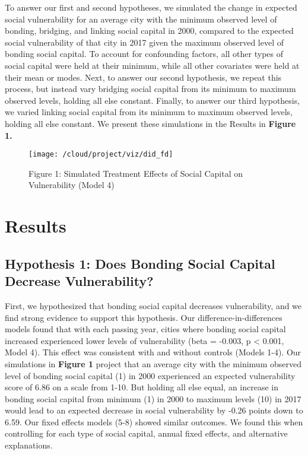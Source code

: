 \documentclass[]{elsarticle} %
\newcommand{\blandscape}{\begin{landscape}}
\newcommand{\elandscape}{\end{landscape}}
\begin{document}
To answer our first and second hypotheses, we simulated the change in
expected social vulnerability for an average city with the minimum
observed level of bonding, bridging, and linking social capital in 2000,
compared to the expected social vulnerability of that city in 2017 given
the maximum observed level of bonding social capital. To account for
confounding factors, all other types of social capital were held at
their minimum, while all other covariates were held at their mean or
modes. Next, to answer our second hypothesis, we repeat this process,
but instead vary bridging social capital from its minimum to maximum
observed levels, holding all else constant. Finally, to answer our third
hypothesis, we varied linking social capital from its minimum to maximum
observed levels, holding all else constant. We present these simulations
in the Results in \textbf{Figure 1.}

\newpage
\blandscape
\begin{figure}
\texttt{[image: /cloud/project/viz/did\_fd]} \caption{Figure 1: Simulated Treatment Effects of Social Capital on Vulnerability (Model 4)}\label{fig:fig1}
\end{figure}
\elandscape
\newpage

\hypertarget{results}{%
\section{Results}\label{results}}

\hypertarget{hypothesis-1-does-bonding-social-capital-decrease-vulnerability}{%
\subsection{Hypothesis 1: Does Bonding Social Capital Decrease
Vulnerability?}\label{hypothesis-1-does-bonding-social-capital-decrease-vulnerability}}

First, we hypothesized that bonding social capital decreases
vulnerability, and we find strong evidence to support this hypothesis.
Our difference-in-differences models found that with each passing year,
cities where bonding social capital increased experienced lower levels
of vulnerability (beta = -0.003, p \textless{} 0.001, Model 4). This
effect was consistent with and without controls (Models 1-4). Our
simulations in \textbf{Figure 1} project that an average city with the
minimum observed level of bonding social capital (1) in 2000 experienced
an expected vulnerability score of 6.86 on a scale from 1-10. But
holding all else equal, an increase in bonding social capital from
minimum (1) in 2000 to maximum levels (10) in 2017 would lead to an
expected decrease in social vulnerability by -0.26 points down to 6.59.
Our fixed effects models (5-8) showed similar outcomes. We found this
when controlling for each type of social capital, annual fixed effects,
and alternative explanations.
\end{document}
